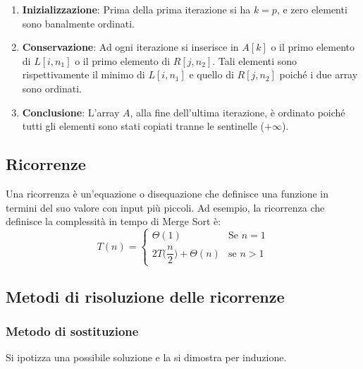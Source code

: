 \documentclass[a4paper,10pt]{article}
\theoremstyle{definition}
\begin{document}
\begin{enumerate}
    \item \textbf{Inizializzazione}: Prima della prima iterazione si ha $k = p$, e zero elementi sono banalmente ordinati.
    \item \textbf{Conservazione}: Ad ogni iterazione si inserisce in $A[k]$ o il primo elemento di $L[i, n_1]$ o il primo elemento di $R[j, n_2]$. Tali elementi sono rispettivamente il minimo di $L[i, n_1]$ e quello di $R[j, n_2]$ poiché i due array sono ordinati.
    \item \textbf{Conclusione}: L'array $A$, alla fine dell'ultima iterazione, è ordinato poiché tutti gli elementi sono stati copiati tranne le sentinelle ($+\infty$).
\end{enumerate}

\newpage
\subsection{Ricorrenze}
Una ricorrenza è un'equazione o disequazione che definisce una funzione in termini del suo valore con input più piccoli. Ad esempio, la ricorrenza che definisce la complessità in tempo di Merge Sort è:
\[T(n) = \begin{cases}
            \Theta(1) &\text{Se $n = 1$}\\
            2T\bigg(\dfrac{n}{2}\bigg) + \Theta(n) &\text{se $n > 1$}
         \end{cases}
\]
\subsection{Metodi di risoluzione delle ricorrenze}
\subsubsection{Metodo di sostituzione}
Si ipotizza una possibile soluzione e la si dimostra per induzione.
\end{document}
